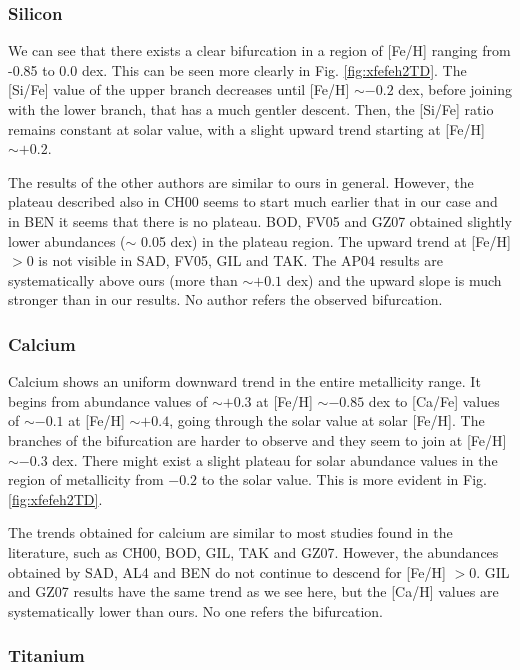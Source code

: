\documentclass[oldversion]{aa}
\begin{document}
\subsubsection {Silicon}

We can see that there exists a clear bifurcation in a region of [Fe/H] ranging from -0.85 to 0.0 dex. This can be seen more clearly in Fig. \ref{fig:xfefeh2TD}. The [Si/Fe] value of the upper branch decreases until [Fe/H] $\sim -0.2$ dex, before joining with the lower branch, that has a much gentler descent. Then, the [Si/Fe] ratio remains constant at solar value, with a slight upward trend starting at [Fe/H] $\sim +0.2$.

The results of the other authors are similar to ours in general. However, the plateau described also in CH00 seems to start much earlier that in our case and in BEN it seems that there is no plateau. BOD, FV05 and GZ07 obtained slightly lower abundances ($\sim$ 0.05 dex) in the plateau region. The upward trend at [Fe/H] $>0$ is not visible in SAD, FV05, GIL and TAK. The AP04 results are systematically above ours (more than $\sim +0.1$ dex) and the upward slope is much stronger than in our results. No author refers  the observed bifurcation.

\subsubsection{Calcium}

Calcium shows an uniform downward trend in the entire metallicity range. It begins from abundance values of $\sim +0.3$ at [Fe/H] $\sim -0.85$ dex to [Ca/Fe] values of $\sim -0.1$ at [Fe/H] $\sim +0.4$, going through the solar value at solar [Fe/H]. The branches of the bifurcation are harder to observe and they seem to join at [Fe/H] $\sim -0.3$ dex. There might exist a slight plateau for solar abundance values in the region of metallicity from $-0.2$ to the solar value. This is more evident in Fig. \ref{fig:xfefeh2TD}.

The trends obtained for calcium are similar to most studies found in the literature, such as CH00, BOD, GIL, TAK and GZ07. However, the abundances obtained by SAD, AL4 and BEN do not continue to descend for [Fe/H] $>0$. GIL and GZ07 results have the same trend as we see here, but the [Ca/H] values are systematically lower than ours. No one refers the bifurcation.


\subsubsection{Titanium}
\end{document}
